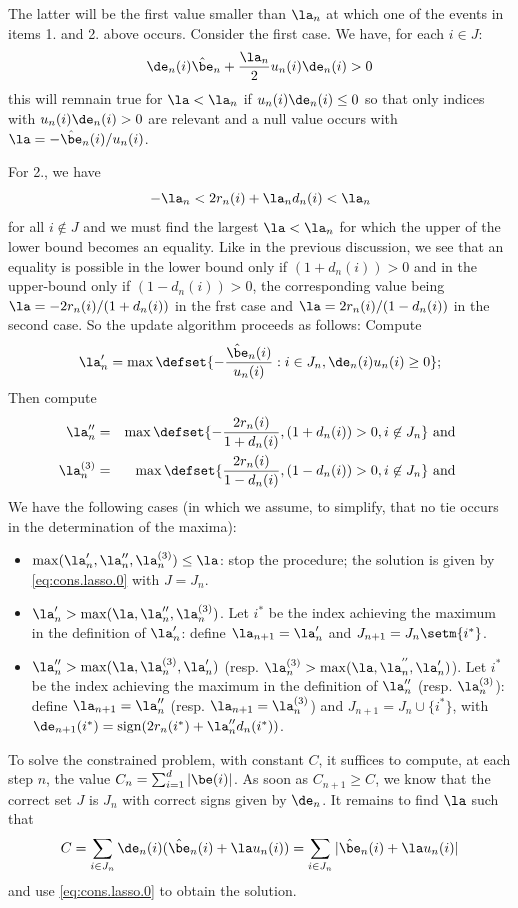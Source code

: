 The latter will be the first value
smaller than $\la_n$ at which one of the events in items 1. and
2. above occurs. Consider the first case. We have, for each $i\in J$:
$$
\de_n(i) \hat\be_n + \frac{\la_n}{2} u_{n}(i)\de_n(i) > 0
$$
this will remnain true for $\la <\la_n$ if $u_n(i)\de_n(i) \leq
0$ so that only indices with $u_n(i)\de_n(i) > 0$ are relevant
and a null value occurs with $\la = -\hat \be_n(i) /
u_n(i)$. 

For 2., we have 
$$
-\la_n < 2r_n(i) + \la_n d_n(i) < \la_n
$$
for all $i\not\in J$ and we must find the largest $\la <\la_n$ for
which the upper of the lower bound becomes an equality. Like in the
previous discussion, we see that an equality is possible in the lower
bound only if $(1+d_n(i))>0$ and in the upper-bound only if
$(1-d_n(i))>0$, the corresponding value being $\la = -2r_n(i)
/(1+d_n(i))$ in the frst case and $\la = 2r_n(i)
/(1-d_n(i))$ in the second case. So the update algorithm proceeds as follows:
 Compute 
$$\la'_n = \max\defset{- \frac{\hat\be_n(i)}{u_n(i)}: i\in J_n, \de_n(i)
  u_n(i) \geq 0};$$
Then compute
\begin{eqnarray*}
\la''_n &=& \max\defset{-\frac{2r_n(i)}{1+d_n(i)}, (1+d_n(i))>0,
  i\not\in J_n} \text{ and } \\
\la^{(3)}_n &=& \max\defset{\frac{2r_n(i)}{1-d_n(i)}, (1-d_n(i))>0,
  i\not\in J_n} \text{ and }
\end{eqnarray*}
We have the following cases (in which we assume, to simplify, that no
tie occurs in the determination of the maxima):
\begin{itemize}
\item[1.] $\max(\la'_n, \la''_n, \la^{(3)}_n) \leq \la$: stop the procedure; the solution
  is given by \eqref{eq:cons.lasso.0} with $J=J_n$.
\item[2.] $\la_n' >\max(\la, \la''_n, \la^{(3)}_n)$. Let $i^*$ be the index achieving
  the maximum in the definition of $\la'_n$: define $\la_{n+1} = \la'_n$
  and $J_{n+1} = J_n \setm \{i^*\}$.
\item[3.] $\la_n''  >\max(\la, \la^{(3)}_n, \la'_n)$ (resp. $\la_n^{(3)}  >\max(\la, \la^{''}_n, \la'_n)$). Let $i^*$ be the index achieving
  the maximum in the definition of $\la''_n$ (resp.  $\la^{(3)}_n$):
  define $\la_{n+1} = \la''_n$ (resp. $\la_{n+1}  =  \la^{(3)}_n$)
  and $J_{n+1} = J_n \cup \{i^*\}$, with $\de_{n+1}(i^*) =
  \mathrm{sign}(2r_n(i^*) + \la_n'' d_n(i^*))$. 
\end{itemize}

To solve the constrained problem, with constant $C$, it suffices to
compute, at each step $n$, the value $C_n = \sum_{i=1}^d |\be(i)|$. As
soon as $C_{n+1} \geq C$, we know that the correct set $J$ is $J_n$
with correct signs given by $\de_n$. It remains to find $\la$ such that
$$
C = \sum_{i\in J_n} \de_n(i)(\hat \be_n(i) + \la u_n(i)) = \sum_{i\in
  J_n} |\hat \be_n(i) + \la u_n(i)|
$$
and use \eqref{eq:cons.lasso.0} to obtain the solution.


